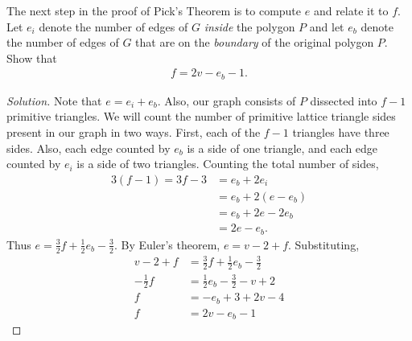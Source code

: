 \documentclass[12pt]{article}
\newenvironment{exercise}[2][Exercise]{\begin{trivlist}
        \item[\hskip \labelsep {\bfseries #1}\hskip \labelsep {\bfseries #2.}]}{\end{trivlist}}
\newenvironment{solution}
        {\begin{proof}[Solution]}
                    {\end{proof}}
\begin{document}
\begin{exercise}{59}
    The next step in the proof of Pick's Theorem is to compute \( e \) and relate it to \( f. \) Let \( e_{i} \) denote the number of edges of \( G \) \textit{inside} the polygon \( P \) and let \( e_{b} \) denote the number of edges of \( G \) that are on the \textit{boundary} of the original polygon \( P. \) Show that
    \begin{align*}
        f = 2v - e_{b} -1.
    \end{align*}
    \begin{solution}
        Note that \( e = e_{i} + e_{b} . \) Also, our graph consists of \( P \) dissected into \( f-1 \) primitive triangles. We will count the number of primitive lattice triangle sides present in our graph in two ways. First, each of the $f-1$ triangles have three sides. Also, each edge counted by $e_b$ is a side of one triangle, and each edge counted by $e_i$ is a side of two triangles. Counting the total number of sides,
        \begin{align*}
            3(f-1) = 3f - 3 &= e_{b} + 2 e_{i} \\
            &= e_{b} + 2 (e - e_{b}) \\
            &= e_{b} + 2e - 2 e_{b} \\
            &= 2e - e_{b} .
        \end{align*}
        Thus \( e = \frac{3}{2} f + \frac{1}{2} e_{b} - \frac{3}{2}. \) By Euler's theorem, \( e = v-2+f . \) Substituting,
        \begin{align*}
            v-2+f &= \frac{3}{2} f + \frac{1}{2} e_{b} - \frac{3}{2} \\
            -\frac{1}{2} f &= \frac{1}{2} e_{b} - \frac{3}{2} -v +2\\
            f &= -e_{b} + 3 + 2v - 4\\
            f &= 2v - e_{b} -1
        \end{align*}
    \end{solution}
\end{exercise}
\end{document}
